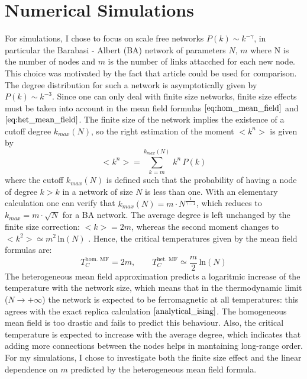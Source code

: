 \section{Numerical Simulations}
For simulations, I chose to focus on scale free networks $P(k) \sim k^{-\gamma}$, in particular the Barabasi - Albert (BA) network of parameters $N,\, m$ where N is the number of nodes and $m$ is the number of links attacched for each new node. This choice was motivated by the fact that article \cite{numeric_ising} could be used for comparison. The degree distribution for such a network is asymptotically given by $P(k) \sim k^{-3}$. Since one can only deal with finite size networks, finite size effects must be taken into account in the mean field formulas $\ref{eq:hom_mean_field}$ and $\ref{eq:het_mean_field}$.
The finite size of the network implies the existence of a cutoff degree $k_{max}(N)$, so the right estimation of the moment $<k^n>$ is given by
\begin{equation*}
    <k^n> = \sum_{k=m}^{k_{max}(N)}\, k^n\,P(k)
\end{equation*}
where the cutoff $k_{max}(N)$ is defined such that the probability of having a node of degree $k>k$ in a network of size $N$ is less than one. With an elementary calculation one can verify that $k_{max}(N)= m\cdot N^{\frac{1}{\gamma -1}}$, which reduces to $k_{max} = m\cdot \sqrt{N}$ for a BA network.
The average degree is left unchanged by the finite size correction:  $<k> = 2m$, whereas the second moment changes to $<k^2> \simeq m^2\,\text{ln}(N)$ \cite{analytical_ising}. Hence, the critical temperatures given by the mean field formulas are:
\begin{equation}
    T_C^{\text{hom. MF}} = 2m, \quad \quad T_C^{\text{het. MF}} \simeq \frac{m}{2}\,\text{ln}(N)
\end{equation}
The heterogeneous mean field approximation predicts a logaritmic increase of the temperature with the network size, which means that in the thermodynamic limit ($N\rightarrow +\infty$) the network is expected to be ferromagnetic at all temperatures: this agrees with the exact replica calculation $\cite{analytical_ising}$. The homogeneous mean field is too drastic and fails to predict this behaviour. Also, the critical temperature is expected to increase with the average degree, which indicates that adding more connections between the nodes helps in mantaining long-range order. \\
For my simulations, I chose to investigate both the finite size effect and the linear dependence on $m$ predicted by the heterogeneous mean field formula.




